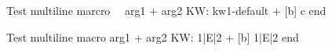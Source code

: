\documentclass{article}
\author{Macro Kwarg Test}
\begin{document}
	Test multiline marcro \ \ arg1 + arg2 KW: kw1-default + 
		c end

	Test multiline macro 
	arg1 + arg2 KW: 1|E|2 +  
		1|E|2
		end
\end{document}
